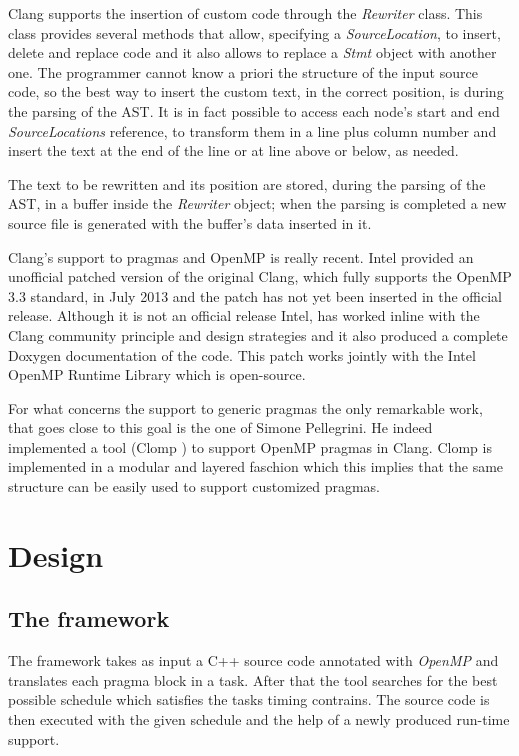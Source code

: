\documentclass[a4paper,11pt,oneside]{book}
\begin{document}
Clang supports the insertion of custom code through the \emph{Rewriter} class. This class provides several methods that allow, specifying a \emph{SourceLocation}, to insert, delete and replace code and it also allows to replace a \emph{Stmt} object with another one. The programmer cannot know a priori the structure of the input source code, so the best way to insert the custom text, in the correct position, is during the parsing of the AST. It is in fact possible to access each node’s start and end \emph{SourceLocations} reference, to transform them in a line plus column number and insert the text at the end of the line or at line above or below, as needed. 

The text to be rewritten and its position are stored, during the parsing of the AST, in a buffer inside the \emph{Rewriter} object; when the parsing is completed a new source file is generated with the buffer’s data inserted in it.  

Clang’s support to pragmas and OpenMP is really recent. Intel provided an unofficial patched version of the original Clang, which fully supports the OpenMP 3.3 standard, in July 2013 and the patch has not yet been inserted in the official release. Although it is not an official release Intel, has worked inline with the Clang community principle and design strategies and it also produced a complete Doxygen documentation of the code. This patch works jointly with the Intel OpenMP Runtime Library \cite{intelomprtl} which is open-source. 

For what concerns the support to generic pragmas the only remarkable work, that goes close to this goal is the one of Simone Pellegrini. He indeed implemented a tool (Clomp \cite{clomp}) to support OpenMP pragmas in Clang. Clomp is implemented in a modular and layered faschion which this implies that the same structure can be easily used to support customized pragmas.
 



\chapter{Design}
\section{The framework}

The framework takes as input a C++ source code annotated with \emph{OpenMP} and translates each pragma block in a task. After that the tool searches for the best possible schedule which satisfies the tasks timing contrains. The source code is then executed with the given schedule and the help of a newly produced run-time support.
\end{document}
